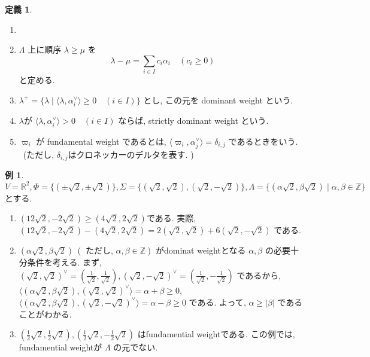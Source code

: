 \documentclass[
  a4paper, 
  12pt,
  ja=standard,
  xelatex,
  left=30truemm,
  right=30truemm,
  titlepage 
]{bxjsarticle}
\theoremstyle{definition}
\newtheorem{df}{定義}
\newtheorem*{ex}{例}
\begin{document}
\begin{df}
  \begin{enumerate}
    \item []
    \item $\Lambda$ 上に順序 $\lambda \geq \mu$ を
      $$ \lambda - \mu = \sum_{i \in I} c_i \alpha_i \quad ( c_i \geq 0 ) $$
      と定める.
    \item $\lambda^{+} = \{ \lambda \mid \langle \lambda, \alpha_i^{\vee} \rangle \geq 0 \quad (i \in I) \}$ とし, この元を dominant weight という.
    \item $\lambda$が $\langle \lambda, \alpha_i^{\vee} \rangle > 0 \quad (i \in I)$ ならば, strictly dominant weight という.
    \item $\varpi_i$ が fundamental weight であるとは, $\langle \varpi_i, \alpha_j^{\vee} \rangle = \delta_{i, j}$
    であるときをいう. \ (ただし, $\delta_{i, j}$はクロネッカーのデルタを表す. )
  \end{enumerate}
\end{df}

\begin{ex}
  $V = \mathbb{R}^2, \Phi = \{ (\pm \sqrt{2}, \pm \sqrt{2})\}, \Sigma = \{ ( \sqrt{2}, \sqrt{2}), ( \sqrt{2}, - \sqrt{2})\}, \Lambda = \{  (\alpha \sqrt{2}, \beta \sqrt{2}) \mid \alpha, \beta \in \mathbb{Z} \}$ とする.
  \begin{enumerate}
    \item $(12 \sqrt{2}, -2 \sqrt{2}) \geq (4 \sqrt{2}, 2 \sqrt{2})$である. 実際, $(12 \sqrt{2}, -2 \sqrt{2}) - (4 \sqrt{2}, 2 \sqrt{2}) = 2 ( \sqrt{2}, \sqrt{2}) + 6 ( \sqrt{2}, - \sqrt{2})$ である.
    \item $(\alpha \sqrt{2}, \beta \sqrt{2}) \ ( \text{ ただし, }\alpha, \beta \in \mathbb{Z} )$ がdominat weightとなる $\alpha, \beta$ の必要十分条件を考える.
    まず, $( \sqrt{2}, \sqrt{2})^{ \vee } = ( \frac{1}{\sqrt{2}}, \frac{1}{\sqrt{2}}), ( \sqrt{2}, - \sqrt{2})^{ \vee } = ( \frac{1}{\sqrt{2}}, - \frac{1}{\sqrt{2}})$ であるから,
    $\langle (\alpha \sqrt{2}, \beta \sqrt{2}) ,( \sqrt{2}, \sqrt{2})^{ \vee } \rangle = \alpha + \beta \geq 0$, $\langle (\alpha \sqrt{2}, \beta \sqrt{2}) ,( \sqrt{2}, - \sqrt{2})^{ \vee } \rangle = \alpha - \beta \geq 0$ である.
    よって, $\alpha \geq | \beta | $ であることがわかる.
    \item $(\frac{1}{2}\sqrt{2}, \frac{1}{2}\sqrt{2}), (\frac{1}{2}\sqrt{2}, - \frac{1}{2}\sqrt{2})$ はfundamential weightである.
    この例では, fundamential weightが $\Lambda$ の元でない.
  \end{enumerate} 
\end{ex}
\end{document}
